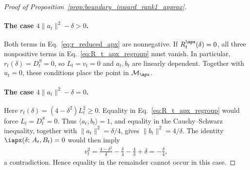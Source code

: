 \documentclass{article}
\begin{document}
\begin{proof}[Proof of Proposition~\ref{prop:boundary_inward_rank1_approx}]
\paragraph{The case $4\|a_t\|^2-\delta>0$.}
Both terms in Eq.~\eqref{eq:r_reduced_apx} are nonnegative. If
$R_t^\apx(\delta)=0$, all three nonpositive terms in
Eq.~\eqref{eq:R_t_apx_regroup} must vanish. In particular,
$r_t(\delta)=D_t^S=0$, so $L_t=v_t=0$ and $a_t,b_t$ are linearly dependent.
Together with $u_t=0$, these conditions place the point in $\mathcal M_\apx$.

\paragraph{The case $4\|a_t\|^2-\delta=0$.}
Here $r_t(\delta)=(4-\delta^2)L_t^2\ge0$. Equality in
Eq.~\eqref{eq:R_t_apx_regroup} would force $L_t=D_t^S=0$. Thus
$\langle a_t,b_t\rangle=1$, and equality in the Cauchy--Schwarz inequality,
together with $\|a_t\|^2=\delta/4$, gives $\|b_t\|^2=4/\delta$.
The identity $\iapx(\delta;\,A_t,B_t)=0$ would then imply
\begin{align}
    v_t^2
    =\frac{4-\delta^2}{\delta}
     -\frac{\delta}{4}-\frac{4}{\delta}+\delta
    =-\frac{\delta}{4},
\end{align}
a contradiction. Hence equality in the remainder cannot occur in this case.


\end{proof}
\end{document}
